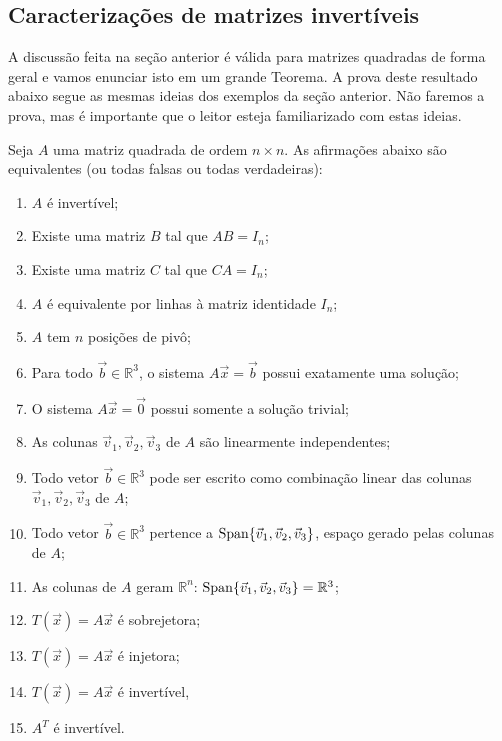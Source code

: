 \documentclass[../livro.tex]{subfiles}  %
\begin{document}
\subsection{Caracterizações de matrizes invertíveis}


A discussão feita na seção anterior é válida para matrizes quadradas de forma geral e vamos enunciar isto em um grande Teorema. A prova deste resultado abaixo segue as mesmas ideias dos exemplos da seção anterior. Não faremos a prova, mas é importante que o leitor esteja familiarizado com estas ideias.


\begin{theorem}
	Seja $A$ uma matriz quadrada de ordem $n\times n$. As afirmações abaixo são equivalentes (ou todas falsas ou todas verdadeiras):
	\begin{enumerate}
		\item $A$ é invertível;
		\item Existe uma matriz $B$ tal que $AB = I_n$;
		\item Existe uma matriz $C$ tal que $CA = I_n$;
		\item $A$ é equivalente por linhas à matriz identidade $I_n$;
		\item $A$ tem $n$ posições de pivô;
		\item Para todo $\vec{b} \in \mathbb{R}^3$, o sistema $A \vec{x} = \vec{b}$ possui exatamente uma solução;
		\item O sistema $A \vec{x} = \vec{0}$ possui somente a solução trivial;
		\item As colunas $\vec{v}_1, \vec{v}_2, \vec{v}_3$ de $A$ são linearmente independentes;
		\item Todo vetor $\vec{b} \in \mathbb{R}^3$ pode ser escrito como combinação linear das colunas $\vec{v}_1, \vec{v}_2, \vec{v}_3$ de $A$;
		\item Todo vetor $\vec{b} \in \mathbb{R}^3$ pertence a $\operatorname{Span}\{\vec{v}_1, \vec{v}_2, \vec{v}_3\}$, espaço gerado pelas colunas de $A$;
		\item As colunas de $A$ geram $\mathbb{R}^n$: $\operatorname{Span}\{\vec{v}_1, \vec{v}_2, \vec{v}_3\} = \mathbb{R}^3$;
		\item $T(\vec{x}) = A \vec{x}$ é sobrejetora;
		\item $T(\vec{x}) = A \vec{x}$ é injetora;
		\item $T(\vec{x}) = A \vec{x}$ é invertível,
		\item $A^T$ é invertível.
	\end{enumerate}
\end{theorem}
\end{document}
